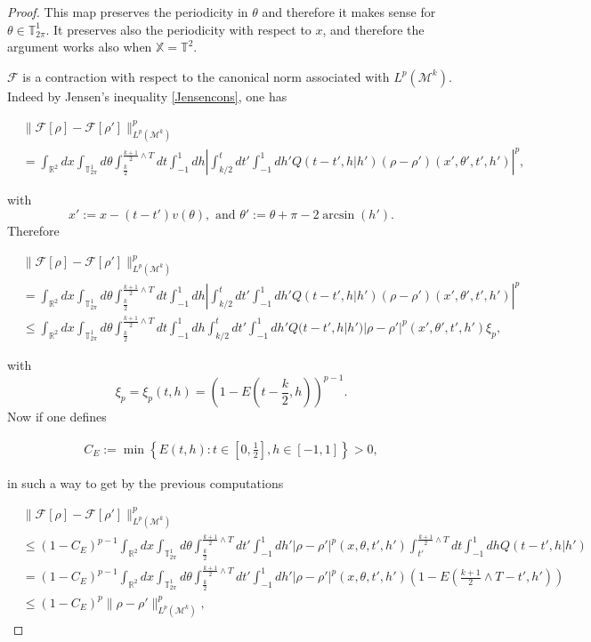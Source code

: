 \documentclass[a4paper,10pt,reqno]{amsart}
\numberwithin{equation}{subsection}
\numberwithin{figure}{subsection}
\begin{document}
\begin{proof}
This map preserves the periodicity in $\theta$ and therefore it makes sense for $\theta\in\mathbb{T}^1_{2\pi}$. It preserves also the periodicity with respect to $x$, and therefore the argument works also when $\mathbb{X}=\mathbb{T}^2$.

${\mathcal F}$ is a contraction with respect to the canonical norm associated with $L^p({\mathcal M}^k)$. Indeed by Jensen's inequality \eqref{Jensencons}, one has

{\small\begin{align*}
&\|{\mathcal F}[\rho]-{\mathcal F}[\rho']\|_{L^p({\mathcal M}^k)}^p
\\
&=\int_{\mathbb{R}^2}dx\int_{\mathbb{T}^1_{2\pi}}d\theta\int_{\frac{k}{2}}^{\frac{k+1}{2}\wedge T}dt\int_{-1}^1dh\left|\int_{k/2}^tdt'\int_{-1}^1dh' Q(t-t',h|h')(\rho-\rho')(x',\theta',t',h')\right|^p,
\end{align*}}

with 
\[
x':=x-(t-t')v(\theta),\textrm{ and }\theta':=\theta+\pi-2\arcsin(h').
\]
Therefore

{\footnotesize\begin{align*}
&\|{\mathcal F}[\rho]-{\mathcal F}[\rho']\|_{L^p({\mathcal M}^k)}^p
\\
&=\int_{\mathbb{R}^2}dx\int_{\mathbb{T}^1_{2\pi}}d\theta\int_{\frac{k}{2}}^{\frac{k+1}{2}\wedge T}dt\int_{-1}^1dh\left|\int_{k/2}^tdt'\int_{-1}^1dh' Q(t-t',h|h')(\rho-\rho')(x',\theta',t',h')\right|^p
\\
&\leq\int_{\mathbb{R}^2}dx\int_{\mathbb{T}^1_{2\pi}}d\theta\int_{\frac{k}{2}}^{\frac{k+1}{2}\wedge T}dt\int_{-1}^1dh\int_{k/2}^tdt'\int_{-1}^1dh' Q(t-t',h|h')|\rho-\rho'|^p(x',\theta',t',h')\xi_p,
\end{align*}}

with
\[
\xi_p=\xi_p(t,h)=(1-E(t-\frac{k}{2},h))^{p-1}.
\]
Now if one defines

\begin{align*}
C_E:=\min \left\{E(t,h):t\in\left[0,\frac{1}{2}\right],h\in[-1,1]\right\}>0,
\end{align*}

in such a way to get by the previous computations

{\tiny\begin{align*}
&\|{\mathcal F}[\rho]-{\mathcal F}[\rho']\|_{L^p({\mathcal M}^k)}^p
\\
&\leq(1-C_E)^{p-1}\int_{\mathbb{R}^2}dx\int_{\mathbb{T}^1_{2\pi}}d\theta\int_{\frac{k}{2}}^{\frac{k+1}{2}\wedge T}dt'\int_{-1}^1dh'|\rho-\rho'|^p(x,\theta,t',h')\int_{t'}^{\frac{k+1}{2}\wedge T}dt\int_{-1}^1dh Q(t-t',h|h')
\\
&=(1-C_E)^{p-1}\int_{\mathbb{R}^2}dx\int_{\mathbb{T}^1_{2\pi}}d\theta\int_{\frac{k}{2}}^{\frac{k+1}{2}\wedge T}dt'\int_{-1}^1dh'|\rho-\rho'|^p(x,\theta,t',h')\left(1-E\left(\frac{k+1}{2}\wedge T-t',h'\right)\right)
\\
&\leq(1-C_E)^p\|\rho-\rho'\|_{L^p({\mathcal M}^k)}^p,
\end{align*}}


\end{proof}
\end{document}
